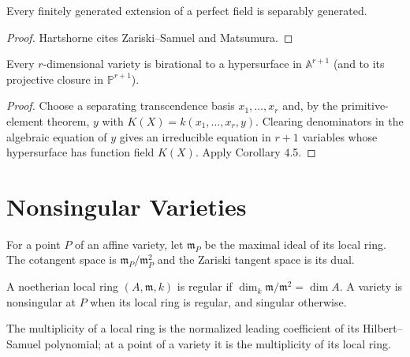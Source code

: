 \begin{theorem}
\label{thm:ha-ch1-4-8A}
Every finitely generated extension of a perfect field is separably generated.
\end{theorem}
\begin{proof}
Hartshorne cites Zariski--Samuel and Matsumura.
\end{proof}

\begin{proposition}
\label{prop:ha-ch1-4-9}
Every $r$-dimensional variety is birational to a hypersurface in $\mathbb A^{r+1}$ (and to its
projective closure in $\mathbb P^{r+1}$).
\end{proposition}
\begin{proof}
Choose a separating transcendence basis $x_1,\ldots,x_r$ and, by the primitive-element theorem,
$y$ with $K(X)=k(x_1,\ldots,x_r,y)$.  Clearing denominators in the algebraic equation of $y$
gives an irreducible equation in $r+1$ variables whose hypersurface has function field $K(X)$.
Apply Corollary 4.5.
\end{proof}

\section{Nonsingular Varieties}

\begin{definition}
\label{def:ha-ch1-tangent-space}
For a point $P$ of an affine variety, let $\mathfrak m_P$ be the maximal ideal of its local ring.
The cotangent space is $\mathfrak m_P/\mathfrak m_P^2$ and the Zariski tangent space is its dual.
\end{definition}

\begin{definition}
\label{def:ha-ch1-regular-local}
A noetherian local ring $(A,\mathfrak m,k)$ is regular if
$\dim_k\mathfrak m/\mathfrak m^2=\dim A$. A variety is nonsingular at $P$ when its local ring is
regular, and singular otherwise.
\end{definition}

\begin{definition}[Multiplicity]
\label{def:ha-ch1-multiplicity}
The multiplicity of a local ring is the normalized leading coefficient of its Hilbert--Samuel
polynomial; at a point of a variety it is the multiplicity of its local ring.
\end{definition}

